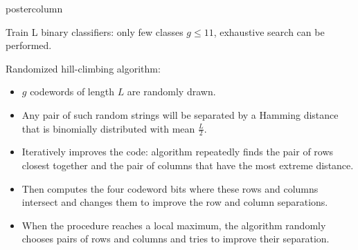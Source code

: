 \documentclass{beamer}
\begin{document}
\begin{frame}[fragile]{}
\begin{columns}
\begin{column}{.31\textwidth}
\begin{beamercolorbox}[center]{postercolumn}
\begin{minipage}{.98\textwidth}
{\begin{myblock}{}
  Train L binary classifiers: only few classes $g \le 11$, exhaustive search can be performed.
  
  Randomized hill-climbing algorithm:
\begin{itemize}[$\bullet$]
  \setlength{\itemindent}{+.3in}
    \item $g$ codewords of length $L$ are randomly drawn. 
    \item Any pair of such random strings will be separated by a Hamming distance that is binomially distributed with mean $\frac{L}{2}$.
    \item Iteratively improves the code: algorithm repeatedly finds the pair of rows closest together and the pair of columns that have the most extreme distance.
    \item Then computes the four codeword bits where these rows and columns intersect and changes them to improve the row and column separations.
    \item When the procedure reaches a local maximum, the algorithm randomly chooses pairs of rows and columns and tries to improve their separation.
  \end{itemize}

\end{myblock}
  }
  
  \end{minipage}
  \end{beamercolorbox}
  \end{column}
  
  
  
\end{columns}
\end{frame}
\end{document}
